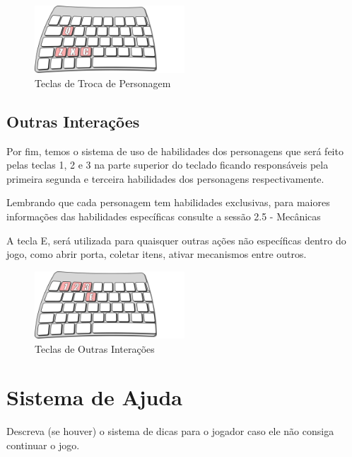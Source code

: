 \begin{figure}[!htb] \caption{\label{fig_tecladoTroca}Teclas de Troca de Personagem} \begin{center}
\includegraphics[width=0.5\textwidth]{imagens/tecladoTroca.png} \end{center}
 \end{figure}

\subsection{Outras Interações}

Por fim, temos o sistema de uso de habilidades dos personagens que será feito pelas teclas 1, 2 e 3 na parte superior do teclado ficando responsáveis pela primeira segunda e terceira habilidades dos personagens respectivamente. 

Lembrando que cada personagem tem habilidades exclusivas, para maiores informações das habilidades específicas consulte a sessão 2.5 - Mecânicas

A tecla E, será utilizada para quaisquer outras ações não específicas dentro do jogo, como abrir porta, coletar itens, ativar mecanismos entre outros.

\begin{figure}[!htb] \caption{\label{fig_tecladoOutras}Teclas de Outras Interações} \begin{center}
\includegraphics[width=0.5\textwidth]{imagens/tecladoOutros.png} \end{center}
 \end{figure}



\section{Sistema de Ajuda}

Descreva (se houver) o sistema de dicas para o jogador caso ele não consiga continuar o jogo.